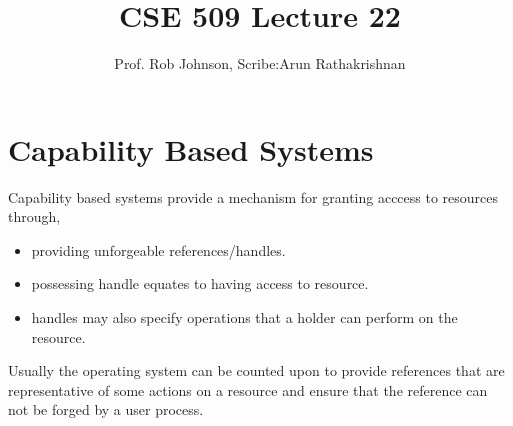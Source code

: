 \documentclass[11pt]{article} %
\title{CSE 509 Lecture 22}
\author{Prof. Rob Johnson, Scribe:Arun Rathakrishnan}
\begin{document}
\maketitle
\section {Capability Based Systems}
Capability based systems provide a mechanism for granting acccess to resources
through,
\begin {itemize} \itemsep -2pt
\item providing unforgeable references/handles.
\item possessing handle equates to having access to resource.
\item handles may also specify operations that a holder can perform on the resource.
\end {itemize}

Usually the operating system can be counted upon to provide references that are
representative of some actions on a resource and ensure that the reference can not
be forged by a user process.
\end{document}
